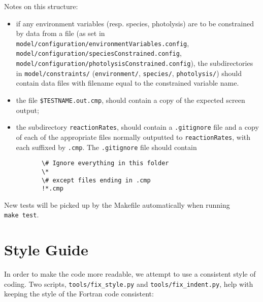 Notes on this structure:

\begin{itemize}
\item if any environment variables (resp. species, photolysis) are to
  be constrained by data from a file (as set in
  \texttt{model/configuration/environmentVariables.config},
  \texttt{model/configuration/speciesConstrained.config},\\
  \texttt{model/configuration/photolysisConstrained.config}), the
  subdirectories in \texttt{model/constraints/}
  (\texttt{environment/}, \texttt{species/}, \texttt{photolysis/})
  should contain data files with filename equal to the constrained
  variable name.
\item the file \texttt{\$TESTNAME.out.cmp}, should contain a copy of
  the expected screen output;
\item the subdirectory \texttt{reactionRates}, should contain a
  \texttt{.gitignore} file and a copy of each of the appropriate files
  normally outputted to \texttt{reactionRates}, with each suffixed by
  \texttt{.cmp}. The \texttt{.gitignore} file should contain

\begin{verbatim}
       \# Ignore everything in this folder
       \*
       \# except files ending in .cmp
       !*.cmp
\end{verbatim}
\end{itemize}

New tests will be picked up by the Makefile automatically when running
\texttt{make\ test}.

\section{Style Guide} \label{sec:style}

In order to make the code more readable, we attempt to use a
consistent style of coding. Two scripts, \texttt{tools/fix\_style.py}
and \texttt{tools/fix\_indent.py}, help with keeping the style of the
Fortran code consistent:

